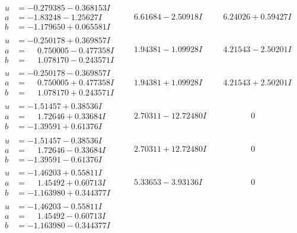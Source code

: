 \documentclass[1p]{elsarticle_modified}
\theoremstyle{definition}
\begin{document}
$$\begin{array}{c|c|c}
\begin{aligned}
u &= -0.279385 - 0.368153 I \\
a &= -1.83248 - 1.25627 I \\
b &= -1.179650 + 0.065581 I\end{aligned}
 & \phantom{-}6.61684 - 2.50918 I & \phantom{-}6.24026 + 0.59427 I \\ \hline\begin{aligned}
u &= -0.250178 + 0.369857 I \\
a &= \phantom{-}0.750005 - 0.477358 I \\
b &= \phantom{-}1.078170 - 0.243571 I\end{aligned}
 & \phantom{-}1.94381 - 1.09928 I & \phantom{-}4.21543 - 2.50201 I \\ \hline\begin{aligned}
u &= -0.250178 - 0.369857 I \\
a &= \phantom{-}0.750005 + 0.477358 I \\
b &= \phantom{-}1.078170 + 0.243571 I\end{aligned}
 & \phantom{-}1.94381 + 1.09928 I & \phantom{-}4.21543 + 2.50201 I \\ \hline\begin{aligned}
u &= -1.51457 + 0.38536 I \\
a &= \phantom{-}1.72646 + 0.33684 I \\
b &= -1.39591 + 0.61376 I\end{aligned}
 & \phantom{-}2.70311 - 12.72480 I & \phantom{-0.000000 } 0 \\ \hline\begin{aligned}
u &= -1.51457 - 0.38536 I \\
a &= \phantom{-}1.72646 - 0.33684 I \\
b &= -1.39591 - 0.61376 I\end{aligned}
 & \phantom{-}2.70311 + 12.72480 I & \phantom{-0.000000 } 0 \\ \hline\begin{aligned}
u &= -1.46203 + 0.55811 I \\
a &= \phantom{-}1.45492 + 0.60713 I \\
b &= -1.163980 + 0.344377 I\end{aligned}
 & \phantom{-}5.33653 - 3.93136 I & \phantom{-0.000000 } 0 \\ \hline\begin{aligned}
u &= -1.46203 - 0.55811 I \\
a &= \phantom{-}1.45492 - 0.60713 I \\
b &= -1.163980 - 0.344377 I\end{aligned}

\end{array}$$
\end{document}
